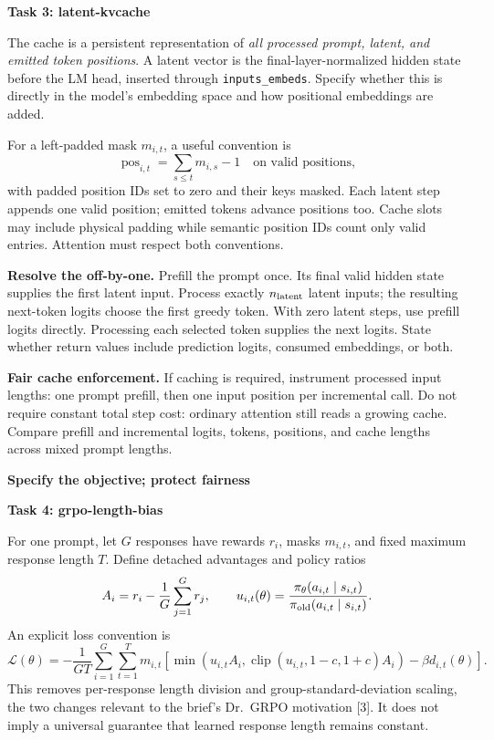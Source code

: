 \documentclass[11pt,a4paper]{article}
\newcommand{\sect}[2]{\vspace{3pt}{\small\color{accent}\textbf{#1}}\par{\LARGE\bfseries #2}\par\vspace{6pt}}
\newcommand{\sub}[1]{\vspace{4pt}\textbf{#1}\par}
\newcommand{\code}[1]{\texttt{#1}}
\begin{document}
\sub{Task 3: latent-kvcache}
The cache is a persistent representation of \emph{all processed prompt, latent, and emitted token positions}. A latent vector is the final-layer-normalized hidden state before the LM head, inserted through \code{inputs\_embeds}. Specify whether this is directly in the model's embedding space and how positional embeddings are added.

For a left-padded mask $m_{i,t}$, a useful convention is
\[
\operatorname{pos}_{i,t}=\sum_{s\leq t}m_{i,s}-1\quad\text{on valid positions},
\]
with padded position IDs set to zero and their keys masked. Each latent step appends one valid position; emitted tokens advance positions too. Cache slots may include physical padding while semantic position IDs count only valid entries. Attention must respect both conventions.

\textbf{Resolve the off-by-one.} Prefill the prompt once. Its final valid hidden state supplies the first latent input. Process exactly $n_{\rm latent}$ latent inputs; the resulting next-token logits choose the first greedy token. With zero latent steps, use prefill logits directly. Processing each selected token supplies the next logits. State whether return values include prediction logits, consumed embeddings, or both.

\textbf{Fair cache enforcement.} If caching is required, instrument processed input lengths: one prompt prefill, then one input position per incremental call. Do not require constant total step cost: ordinary attention still reads a growing cache. Compare prefill and incremental logits, tokens, positions, and cache lengths across mixed prompt lengths.

\newpage
\sect{04 / TASK 4 AND VERIFICATION}{Specify the objective; protect fairness}

\sub{Task 4: grpo-length-bias}
For one prompt, let $G$ responses have rewards $r_i$, masks $m_{i,t}$, and fixed maximum response length $T$. Define detached advantages and policy ratios
\[
A_i=r_i-\frac1G\sum_{j=1}^{G}r_j,\qquad
u_{i,t}(\theta)=\frac{\pi_\theta(a_{i,t}\mid s_{i,t})}{\pi_{\rm old}(a_{i,t}\mid s_{i,t})}.
\]
An explicit loss convention is
\[
\mathcal L(\theta)=-\frac1{GT}\sum_{i=1}^{G}\sum_{t=1}^{T}m_{i,t}
\left[\min\!\left(u_{i,t}A_i,\operatorname{clip}(u_{i,t},1-c,1+c)A_i\right)
-\beta d_{i,t}(\theta)\right].
\]
This removes per-response length division and group-standard-deviation scaling, the two changes relevant to the brief's Dr.\ GRPO motivation [3]. It does not imply a universal guarantee that learned response length remains constant.
\end{document}
